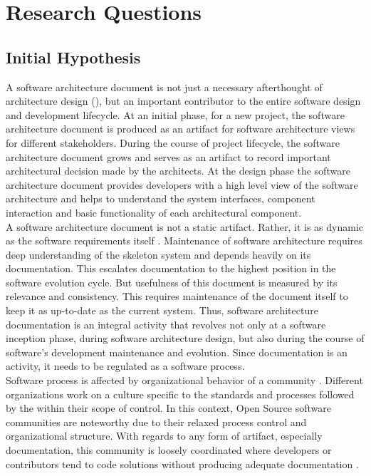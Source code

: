 \chapter{Research Questions}\label{chapter:ResearchQuestions}

\section{Initial Hypothesis}
\indent A software architecture document is not just a necessary afterthought of architecture design (\cite{BachmannDocumentingSoftware2010}), but an important contributor to the entire software design and development lifecycle.  At an initial phase, for a new project, the software architecture document is produced as an artifact for software architecture views for different stakeholders. During the course of project lifecycle, the software architecture document grows and serves as an artifact to record important architectural decision made by the architects. At the design phase the software architecture document provides developers with a high level view of the software architecture and helps to understand the system interfaces, component interaction and basic functionality of each architectural component. 
\\\indent A software architecture document is not a static artifact. Rather, it is as dynamic as the software requirements itself \cite{BachmannDocumentingSoftware2010}. Maintenance of software architecture requires deep understanding of the skeleton system and depends heavily on its documentation. This escalates documentation to the highest position in the software evolution cycle. But usefulness of this document is measured by its relevance and consistency. This requires maintenance of the document itself to keep it as up-to-date as the current system. Thus, software architecture documentation is an integral activity that revolves not only at a software inception phase, during software architecture design, but also during the course of software's development maintenance and evolution. Since documentation is an activity, it needs to be regulated as a software process. 
\\\indent Software process is affected by organizational behavior of a community \cite{Fuggeffa1988}. Different organizations work on a culture specific to the standards and processes followed by the within their scope of control. In this context, Open Source software communities are noteworthy due to their relaxed process control and organizational structure. With regards to any form of artifact, especially documentation, this community is loosely coordinated where developers or contributors tend to code solutions without producing adequate documentation \cite{6923128}.
